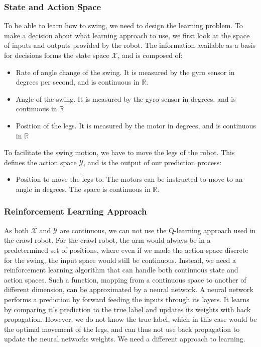 \documentclass[11pt, a4paper]{article}
\begin{document}
	\subsubsection*{State and Action Space}
	To be able to learn how to swing, we need to design the learning problem. To make a decision about what learning approach to use, we first look at the space of inputs and outputs provided by the robot. The information available as a basis for decisions forms the state space $\mathcal{X}$, and is composed of:
	\begin{itemize}
		\item Rate of angle change of the swing. It is measured by the gyro sensor in degrees per second, and is continuous in $\mathbb{R}$. 
		\item Angle of the swing. It is measured by the gyro sensor in degrees, and is continuous in $\mathbb{R}$
		\item Position of the legs. It is measured by the motor in degrees, and is continuous in $\mathbb{R}$
	\end{itemize}
	To facilitate the swing motion, we have to move the legs of the robot. This defines the action space $\mathcal{Y}$, and is the output of our prediction process:
	\begin{itemize}
		\item Position to move the legs to. The motors can be instructed to move to an angle in degrees. The space is continuous in $\mathbb{R}$.
	\end{itemize}
	
	
	\subsubsection*{Reinforcement Learning Approach}
	As both $\mathcal{X}$ and $\mathcal{Y}$ are continuous, we can not use the Q-learning approach used in the crawl robot. For the crawl robot, the arm would always be in a predetermined set of positions, where even if we made the action space discrete for the swing, the input space would still be continuous. 
	Instead, we need a reinforcement learning algorithm that can handle both continuous state and action spaces. Such a function, mapping from a continuous space to another of different dimension, can be approximated by a neural network. A neural network performs a prediction by forward feeding the inputs through its layers. It learns by comparing it's prediction to the true label and updates its weights with back propagation. However, we do not know the true label, which in this case would be the optimal movement of the legs, and can thus not use back propagation to update the neural networks weights. We need a different approach to learning.
	
\end{document}
